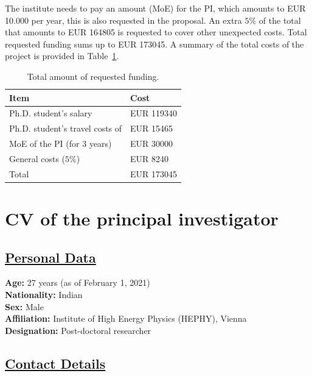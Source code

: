 \documentclass[a4paper,11pt]{article}
\begin{document}
The institute needs to pay an amount (MoE) for the PI, which amounts to EUR 10.000 per year, 
this is also requested in the proposal.
An extra $5\%$ of the total that amounts to EUR 164805 is requested to cover other unexpected costs.  
Total requested funding sums up to EUR 173045.  
A summary of the total costs of the project is provided in Table~\ref{Tab:Total_cost}.
\begin{table}
\caption{Total amount of requested funding.}
\begin{tabular}{m{6 cm}| m{4 cm}}
Item & Cost  \\
\hline 
Ph.D. student's salary & EUR 119340  \\
Ph.D. student's travel costs of & EUR 15465 \\
MoE of the PI (for 3 years) & EUR 30000 \\
\hline
General costs ($5\%$) & EUR 8240  \\
\hline
Total & EUR 173045 
\end{tabular}
\label{Tab:Total_cost}
\end{table}

\newpage


\section{CV of the principal investigator}

\subsection*{\underline{Personal Data}}

\textbf{Age:} 27 years (as of February 1, 2021)\\
\textbf{Nationality:} Indian \\
\textbf{Sex:} Male \\
\textbf{Affiliation:} Institute of High Energy Physics (HEPHY), Vienna \\
\textbf{Designation:} Post-doctoral researcher 


\subsection*{\underline{Contact Details}}
\end{document}
